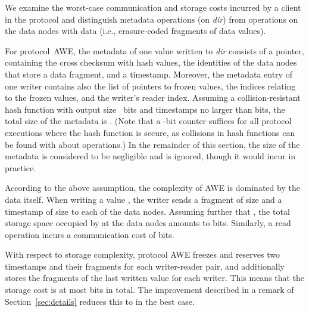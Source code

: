 \documentclass[oribibl]{llncs}
\theoremstyle{definition-boldhead}
\newcommand{\var}[1]{\textit{#1}}
\newcommand{\dir}{\var{dir}\xspace}
\newcommand{\NAME}{AWE\xspace}
\newcommand{\nodes}{nodes\xspace}
\begin{document}
We examine the worst-case communication and storage costs incurred by
a client in the protocol and distinguish metadata operations (on \dir)
from operations on the data \nodes with data (i.e., erasure-coded
fragments of data values).

For protocol~\NAME, the metadata of one value written to \dir consists
of a pointer, containing the cross checksum with  hash values, the
 identities of the data \nodes that store a data fragment, and a
timestamp.  Moreover, the metadata entry of one writer contains also
the list of  pointers to frozen values, the  indices relating to
the frozen values, and the writer's reader index.  Assuming a
collision-resistant hash function with output size~ bits and
timestamps no larger than  bits, the total size of the
metadata is .  (Note that a -bit counter
suffices for all protocol executions where the hash function is
secure, as collisions in hash functions can be found with about
 operations.)  In the remainder of this section, the
size of the metadata is considered to be negligible and is ignored,
though it would incur in practice.

According to the above assumption, the complexity of \NAME is
dominated by the data itself.  When writing a value ,
the writer sends a fragment of size  and a timestamp of size
 to each of the  data \nodes.  Assuming further that , the total storage space occupied by  at the data
\nodes amounts to  bits.  Similarly, a read operation
incurs a communication cost of  bits.

With respect to storage complexity, protocol \NAME freezes and
reserves two timestamps and their fragments for each writer-reader
pair, and additionally stores the fragments of the last written value
for each writer.  This means that the storage cost is at most  bits in total.  The improvement described in a remark of
Section~\ref{sec:details} reduces this to  in the best
case.
\end{document}
